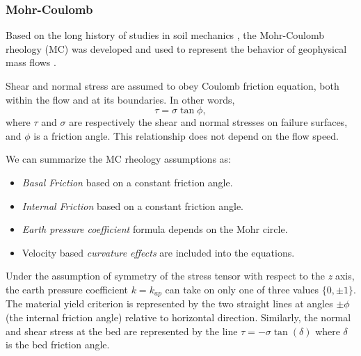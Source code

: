 \documentclass{article}
\begin{document}
\subsubsection{Mohr-Coulomb}\label{MCM}
Based on the long history of studies in soil mechanics \citep{Rankine1857,Jaeger1989}, the Mohr-Coulomb rheology (MC) was developed and used to represent the behavior of geophysical mass flows \cite{SavageHutter1989}.

Shear and normal stress are assumed to obey Coulomb friction equation, both within the flow and at its boundaries. In other words,
\begin{equation}
\tau = \sigma \tan \phi,
\end{equation}
where $\tau$ and $\sigma$ are respectively the shear and normal stresses on failure surfaces, and $\phi$ is a friction angle. This relationship does not depend on the flow speed.

We can summarize the MC rheology assumptions as:
\begin{itemize}
\item \textit{Basal Friction} based on a constant friction angle.

\item \textit{Internal Friction} based on a constant friction angle.

\item \textit{Earth pressure coefficient} formula depends on the Mohr circle.

\item Velocity based \textit{curvature effects} are included into the equations.
\end{itemize}

Under the assumption of symmetry of the stress tensor with respect to the \textit{z} axis, the earth pressure coefficient $k=k_{ap}$ can take on only one of three values $\{ 0, \pm 1\}$.
The material yield criterion is represented by the two straight lines at angles $\pm \phi$ (the internal friction angle) relative to horizontal direction. Similarly, the normal and shear stress at the bed are represented by the line $\tau=-\sigma \tan(\delta)$ where $\delta$ is the bed friction angle.
\end{document}
